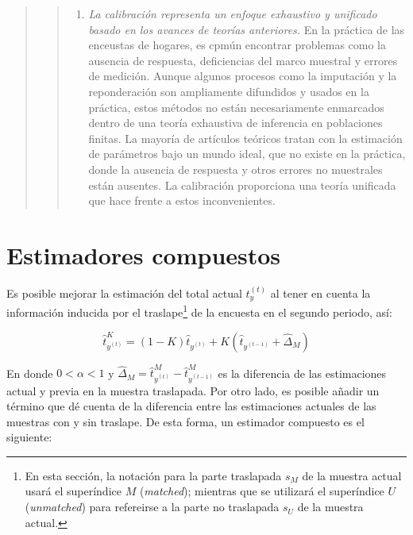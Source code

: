 \documentclass[
  12pt,
]{book}
\providecommand{\tightlist}{%
  \setlength{\itemsep}{0pt}\setlength{\parskip}{0pt}}
\begin{document}
\begin{quote}
\begin{quote}
\begin{enumerate}
\def\labelenumi{\arabic{enumi}.}
\setcounter{enumi}{3}
\tightlist
\item
  \emph{La calibración representa un enfoque exhaustivo y unificado basado en los avances de teorías anteriores.} En la práctica de las enceustas de hogares, es cpmún encontrar problemas como la ausencia de respuesta, deficiencias del marco muestral y errores de medición. Aunque algunos procesos como la imputación y la reponderación son ampliamente difundidos y usados en la práctica, estos métodos no están necesariamente enmarcados dentro de una teoría exhaustiva de inferencia en poblaciones finitas. La mayoría de artículos teóricos tratan con la estimación de parámetros bajo un mundo ideal, que no existe en la práctica, donde la ausencia de respuesta y otros errores no muestrales están ausentes. La calibración proporciona una teoría unificada que hace frente a estos inconvenientes.
\end{enumerate}
\end{quote}
\end{quote}

\hypertarget{estimadores-compuestos}{%
\section{Estimadores compuestos}\label{estimadores-compuestos}}

Es posible mejorar la estimación del total actual \(t_y^{(t)}\) al tener en cuenta la información inducida por el traslape\footnote{En esta sección, la notación para la parte traslapada \(s_M\) de la muestra actual usará el superíndice \(M\) (\emph{matched}); mientras que se utilizará el superíndice \(U\) (\emph{unmatched}) para refereirse a la parte no traslapada \(s_U\) de la muestra actual.} de la encuesta en el segundo periodo, así:

\[
\hat{t}_{y^{(t)}}^K = (1-K) \hat{t}_{y^{(t)}} 
+ K (\hat{t}_{y^{(t-1)}} + \hat{\Delta}_M)
\]

En donde \(0 < \alpha < 1\) y \(\hat{\Delta}_M=\hat{t}_{y^{(t)}}^M - \hat{t}_{y^{(t-1)}}^M\) es la diferencia de las estimaciones actual y previa en la muestra traslapada. Por otro lado, es posible añadir un término que dé cuenta de la diferencia entre las estimaciones actuales de las muestras con y sin traslape. De esta forma, un estimador compuesto es el siguiente:
\end{document}
